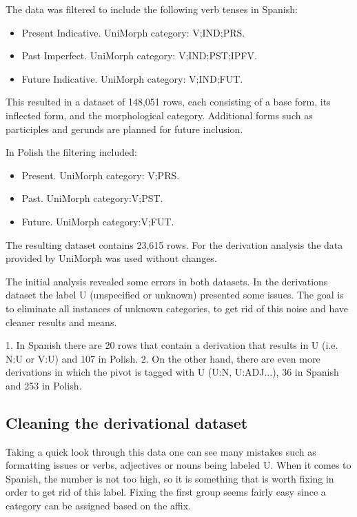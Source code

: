 \documentclass[12pt]{article}
\begin{document}
The data was filtered to include the following verb tenses in Spanish:
\begin{itemize}
    \item Present Indicative. UniMorph category: V;IND;PRS.
    \item Past Imperfect. UniMorph category: V;IND;PST;IPFV.
    \item Future Indicative. UniMorph category: V;IND;FUT.
\end{itemize}


This resulted in a dataset of 148,051 rows, each consisting of a base form, its inflected form, and the morphological category. Additional forms such as participles and gerunds are planned for future inclusion.

 In Polish the filtering included:
\begin{itemize}
    \item Present. UniMorph category: V;PRS.
    \item Past. UniMorph category:V;PST.
    \item Future. UniMorph category:V;FUT.
\end{itemize}

The resulting dataset contains 23,615 rows. For the derivation analysis the data provided by UniMorph was used without changes.


The initial analysis revealed some errors in both datasets. In the derivations dataset the label U (unspecified or unknown) presented some issues. The goal is to eliminate all instances of unknown categories, to get rid of this noise and have cleaner results and means.

1. In Spanish there are 20 rows that contain a derivation that results in U (i.e. N:U or V:U) and 107 in Polish. 
2. On the other hand, there are even more derivations in which the pivot is tagged with U (U:N, U:ADJ...), 36 in Spanish and 253 in Polish. 

\subsection{Cleaning the derivational dataset}

Taking a quick look through this data one can see many mistakes such as formatting issues or  verbs, adjectives or nouns being labeled U. When it comes to Spanish, the number is not too high, so it is something that is worth fixing in order to get rid of this label. Fixing the first group seems fairly easy since a category can be assigned based on the affix.
\end{document}
